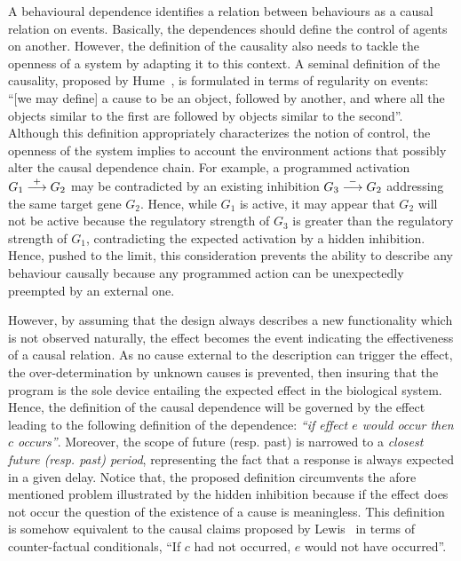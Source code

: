 \documentclass{eptcs}
\newcommand{\ie}[0]{\abbrev{\textit{i.e.}}}
\newcommand{\activate}[0]{\stackrel{+}{\reg}}
\newcommand{\inhibit}[0]{\stackrel{-}{\reg}}
\newcounter{ti}
\begin{document}
 A behavioural dependence identifies a relation between behaviours as a causal relation on events. Basically, the dependences should define the control of agents on another. However, the definition of the causality also needs to tackle the openness of a system by adapting it to this context. A seminal definition of the causality, proposed by Hume~\cite{Hume1739}, is formulated in terms of regularity on events: ``[we may define] a cause to be an object, followed by another, and where all the objects similar to the first are followed by objects similar to the second''. Although this definition appropriately characterizes the notion of control, the openness of the system implies to account the environment actions that possibly alter the causal dependence chain. For example, a programmed activation $G_1 \activate G_2$ may be contradicted by an existing inhibition $G_3 \inhibit G_2$ addressing the same target gene $G_2$. Hence, while $G_1$ is active, it may appear that $G_2$ will not be active because the regulatory strength of $G_3$ is greater than the regulatory strength of $G_1$, contradicting the expected activation by a hidden inhibition. Hence, pushed to the limit, this consideration prevents the ability to describe any behaviour causally because any programmed action can be unexpectedly preempted by an external one. 

However, by assuming that the design always describes a new functionality which is not observed naturally, the effect becomes the event indicating the effectiveness of a causal relation. As no cause external to the description can trigger the effect, the over-determination by unknown causes is prevented, then insuring that the program is the sole device entailing the expected effect in the biological system.
Hence, the definition of the causal dependence will be governed by the effect leading to the following definition of the dependence: \emph{``if effect $e$ would occur then $c$ occurs''}. Moreover, the scope of future (resp. past) is narrowed to a \emph{closest future (resp. past) period}, representing the fact that a response is always expected in a given delay. Notice that, the proposed definition circumvents the afore mentioned problem illustrated by the hidden inhibition because if the effect does not occur the question of the existence of a cause is meaningless. This definition is somehow equivalent to the causal claims proposed by Lewis~\cite{Lewis2000} in terms of counter-factual conditionals, \ie ``If $c$ had not occurred, $e$ would not have occurred''.
 
\end{document}
